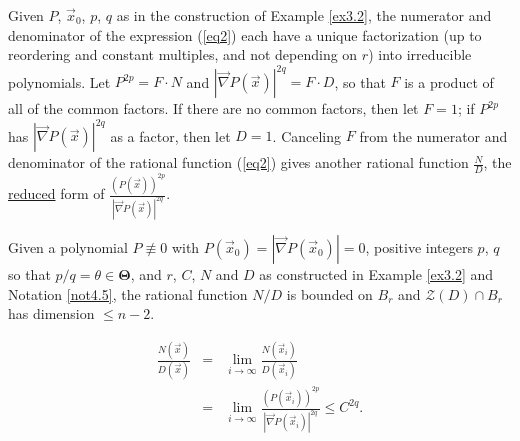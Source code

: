 \documentclass[10pt,a4paper]{amsart}
\newcommand{\vv}{\mathcal{Z}}
\begin{document}
\begin{notation}\label{not4.5}
  Given $P$, $\vec x_0$, $p$, $q$ as in the construction of Example \ref{ex3.2}, the numerator and denominator of the expression (\ref{eq2}) each have a unique factorization (up to reordering and constant multiples, and not depending on $r$) into irreducible polynomials.  Let $P^{2p}=F\cdot N$ and $\left|\vec\nabla P(\vec x)\right|^{2q}=F\cdot D$, so that $F$ is a product of all of the common factors.  If there are no common factors, then let $F=1$; if   $P^{2p}$ has $\left|\vec\nabla P(\vec x)\right|^{2q}$ as a factor, then let $D=1$.  Canceling $F$ from the numerator and denominator of the rational function (\ref{eq2}) gives  another rational function $\displaystyle{\frac ND}$, the {\underline{reduced}} form of $\displaystyle{\frac{(P(\vec x))^{2p}}{\left|\vec\nabla P(\vec x)\right|^{2q}}}$. 
\end{notation}

\begin{thm}\label{thm3.2}
  Given a polynomial $P\not\equiv0$ with $P(\vec x_0)=|\vec\nabla P(\vec x_0)|=0$, positive integers $p$, $q$ so that  $p/q=\theta\in{\mathbf\Theta}$, and $r$, $C$, $N$ and $D$ as constructed in Example {\rm{\ref{ex3.2}}} and Notation {\rm{\ref{not4.5}}}, the rational function $N/D$ is bounded on $B_r$ and $\vv(D)\cap B_r$ has dimension $\le n-2$. 
\end{thm}

\begin{eqnarray}
  \frac{N(\vec x)}{D(\vec x)}&=&\lim_{i\to\infty}\frac{N(\vec x_i)}{D(\vec x_i)}\label{eq4}\\
  &=&\lim_{i\to\infty}\frac{(P(\vec x_i))^{2p}}{\left|\vec\nabla P(\vec x_i)\right|^{2q}}\le C^{2q}.\label{eq7}
\end{eqnarray}
\end{document}
